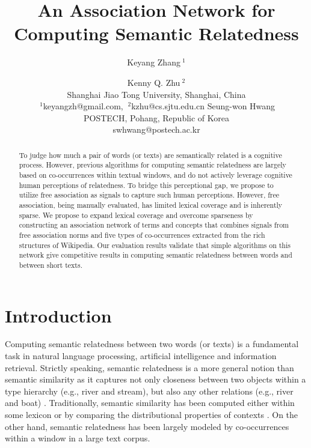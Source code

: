 \documentclass[letterpaper]{article}
\begin{document}

\title{An Association Network for Computing Semantic Relatedness}
\author{
Keyang Zhang{\small $~^{1}$} \and Kenny Q. Zhu{\small $~^{2}$}\\
Shanghai Jiao Tong University, Shanghai, China\\
{\small $~^{1}$}keyangzh@gmail.com, {\small $~^{2}$}kzhu@cs.sjtu.edu.cn
\And
Seung-won Hwang\\
POSTECH, Pohang, Republic of Korea\\
swhwang@postech.ac.kr
}
\maketitle

\begin{abstract}
To judge how much a pair of words (or texts) are semantically related is a
cognitive process. However, previous algorithms for computing semantic
relatedness are largely based on co-occurrences within textual
windows, and do not actively leverage cognitive human perceptions of
relatedness. To bridge this perceptional gap, we propose to utilize
free association as signals to capture such human perceptions.
However, free association, being manually evaluated,
has limited lexical coverage and is inherently sparse. 
We propose to expand lexical coverage and overcome sparseness by 
constructing an association network of terms and concepts 
that combines signals from free association norms and 
five types of co-occurrences extracted from the
rich structures of Wikipedia. Our evaluation results validate that
simple algorithms on this network give competitive results in
computing semantic relatedness between words and between short
texts.
\end{abstract}

\section{Introduction}
\label{sec:intro}
Computing semantic relatedness between two words (or texts)
is a fundamental task in natural language processing,
artificial intelligence and information retrieval. Strictly
speaking, semantic relatedness is a more general notion than
semantic similarity as it captures not only closeness between two
objects within a type hierarchy (e.g., river and stream), but also
any other relations (e.g., river and boat) \cite{Budanitsky:2006}.
Traditionally, semantic similarity has been computed either within
some lexicon \cite{Roget_Jarmasz,Resnik:1995,Jiang:1997,Lin:1998} 
or by comparing the distributional properties
of contexts \cite{LSA,ESA,SSA}.  On the
other hand, semantic relatedness has been largely modeled by
co-occurrences within a window in a large text corpus.
\end{document}
